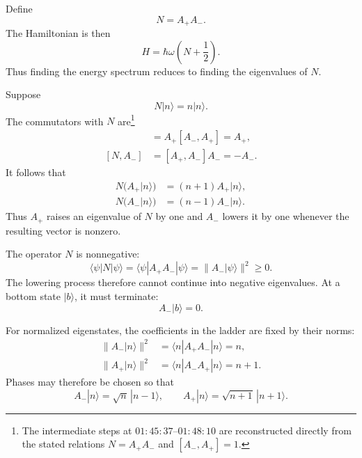 Define
\begin{equation}
N=A_+A_-.
\end{equation}
The Hamiltonian is then
\begin{equation}
H=\hbar\omega\left(N+\frac{1}{2}\right).
\end{equation}
Thus finding the energy spectrum reduces to finding the eigenvalues of \(N\).

Suppose
\begin{equation}
N|n\rangle=n|n\rangle.
\end{equation}
The commutators with \(N\) are\footnote{The intermediate steps at \(01{:}45{:}37\)--\(01{:}48{:}10\) are reconstructed directly from the stated relations \(N=A_+A_-\) and \([A_-,A_+]=1\).}
\begin{align}
[N,A_+]
&=A_+[A_-,A_+]=A_+, \\
[N,A_-]
&=[A_+,A_-]A_-=-A_-.
\end{align}
It follows that
\begin{align}
N\bigl(A_+|n\rangle\bigr)
&=(n+1)A_+|n\rangle, \\
N\bigl(A_-|n\rangle\bigr)
&=(n-1)A_-|n\rangle.
\end{align}
Thus \(A_+\) raises an eigenvalue of \(N\) by one and \(A_-\) lowers it by one whenever the resulting vector is nonzero.

The operator \(N\) is nonnegative:
\begin{equation}
\langle\psi|N|\psi\rangle
=\langle\psi|A_+A_-|\psi\rangle
=\|A_-|\psi\rangle\|^2
\geq0.
\end{equation}
The lowering process therefore cannot continue into negative eigenvalues. At a bottom state \(|b\rangle\), it must terminate:
\begin{equation}
A_-|b\rangle=0.
\end{equation}

For normalized eigenstates, the coefficients in the ladder are fixed by their norms:
\begin{align}
\|A_-|n\rangle\|^2
&=\langle n|A_+A_-|n\rangle=n, \\
\|A_+|n\rangle\|^2
&=\langle n|A_-A_+|n\rangle=n+1.
\end{align}
Phases may therefore be chosen so that
\begin{equation}
A_-|n\rangle=\sqrt{n}\,|n-1\rangle,
\qquad
A_+|n\rangle=\sqrt{n+1}\,|n+1\rangle.
\end{equation}

\begin{classroomqa}
\end{classroomqa}

